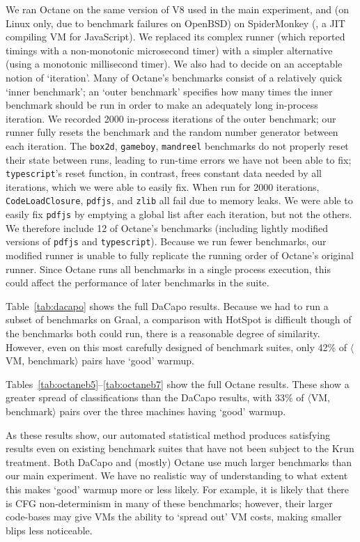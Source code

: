 \documentclass[acmsmall,screen]{acmart}
\newcommand{\krun}{Krun\xspace}
\newcommand{\vmbpair}{$\langle$VM, benchmark$\rangle$\xspace}
\newcommand{\numiterations}{2000\xspace}
\begin{document}
We ran Octane on the same version of V8 used in the main experiment, and (on
Linux only, due to benchmark failures on OpenBSD) on SpiderMonkey
(\spidermonkeyversion, a JIT compiling VM for JavaScript).
We replaced its complex runner (which reported timings with a non-monotonic
microsecond timer) with a simpler alternative (using a monotonic millisecond
timer). We also had to decide on an acceptable notion of `iteration'. Many of Octane's
benchmarks consist of a relatively quick `inner benchmark'; an `outer benchmark'
specifies how many times the inner benchmark should be run in order to make an
adequately long in-process iteration. We recorded \numiterations
in-process iterations of the outer benchmark; our runner
fully resets the benchmark and the random number generator between each
iteration. The \texttt{box2d}, \texttt{gameboy}, \texttt{mandreel} benchmarks do
not properly reset their state between runs, leading to run-time errors we have
not been able to fix; \texttt{typescript}'s reset function, in contrast,
frees constant data needed by all iterations, which we were able
to easily fix. When run for \numiterations iterations, \texttt{CodeLoadClosure},
\texttt{pdfjs}, and \texttt{zlib} all fail due to memory leaks. We were able to
easily fix \texttt{pdfjs} by emptying a global list after each iteration, but not the
others. We therefore include 12 of Octane's benchmarks (including lightly
modified versions of \texttt{pdfjs} and \texttt{typescript}).
Because we run fewer benchmarks, our modified runner is unable to fully
replicate the running order of Octane's original runner. Since Octane runs all
benchmarks in a single process execution, this could affect the performance of
later benchmarks in the suite.

Table~\ref{tab:dacapo} shows the full DaCapo results. Because we had to run
a subset of benchmarks on Graal, a comparison with HotSpot is difficult
though of the benchmarks both could run, there is a reasonable degree
of similarity. However, even on this most carefully designed of benchmark suites, only 42\%
of \vmbpair pairs have `good' warmup.

Tables~\ref{tab:octaneb5}--\ref{tab:octaneb7} show the full Octane results. These
show a greater spread of classifications than the DaCapo results, with
33\% of \vmbpair pairs over the three machines having `good' warmup.

As these results show, our automated statistical method produces satisfying
results even on existing benchmark suites that have not been subject to the
\krun treatment. Both DaCapo and (mostly) Octane use much larger benchmarks than
our main experiment. We have no realistic way of understanding to what extent
this makes `good' warmup more or less likely. For example, it is likely that
there is CFG non-determinism in many of these benchmarks; however, their larger
code-bases may give VMs the ability to `spread out' VM costs, making smaller
blips less noticeable.
\end{document}
